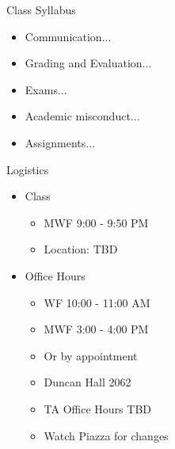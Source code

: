 \documentclass[aspectratio=169]{beamer}
\begin{document}
\begin{frame}{Class Syllabus}
\begin{itemize}
\item Communication...
\item Grading and Evaluation...
\item Exams...
\item Academic misconduct...
\item Assignments... 
\end{itemize}
\end{frame}
\begin{frame}{Logistics}
\begin{itemize}
\item Class
\begin{itemize}
\item MWF 9:00 - 9:50 PM
\item Location: TBD
\end{itemize}
\item Office Hours
\begin{itemize}
\item WF 10:00 - 11:00 AM
\item MWF 3:00 - 4:00 PM
\item Or by appointment
\item Duncan Hall 2062
\item TA Office Hours TBD
\item Watch Piazza for changes
\end{itemize}
\end{itemize}
\end{frame}
\end{document}
